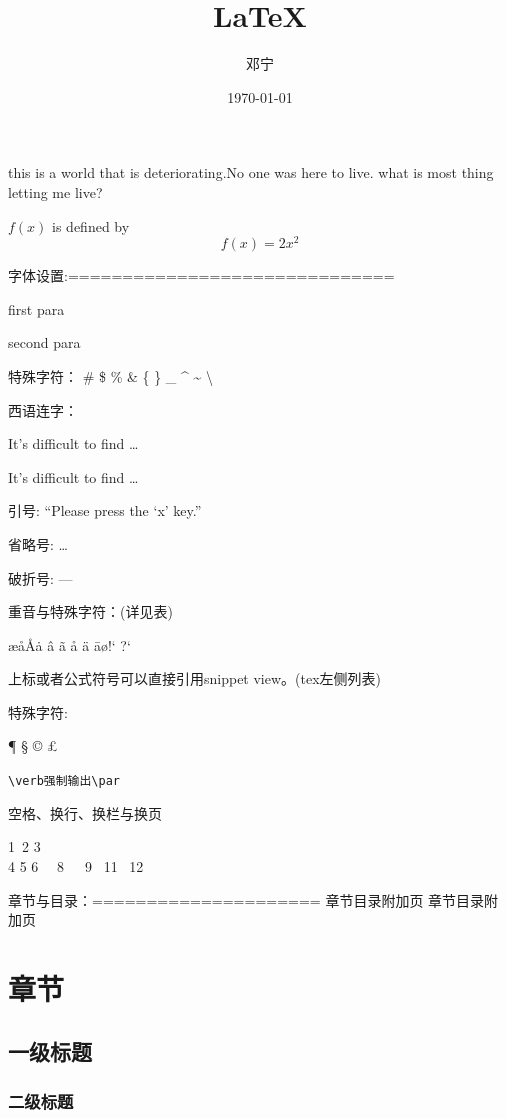 \documentclass[10pt,a4paper,twocolumn]{book}
\title{\LaTeX}
\author{邓宁}
\date{\today}
\begin{document}
\maketitle  %
this is a world that is deteriorating.No one was here to live.
what is most thing letting me live? %

$f(x)$ is defined by $$f(x)=2x^2$$  %

字体设置:==============================

first para
\par second para %

特殊字符：
\# \$ \% \& \{ \} \_ \^{} \~{} \textbackslash

西语连字：
\par It's difficult to find \ldots 
\par It's dif{}f{}icult to f{}ind \ldots

引号: ``Please press the `x' key.''

省略号: \dots

破折号: ---

重音与特殊字符：(详见表)

\ae \aa \AA \.a \^a \~a \r a \"a \=a\o !` ?`

上标或者公式符号可以直接引用snippet view。(tex左侧列表)

特殊字符:

\P{} \S{} \dag{} \ddag{}
\copyright{} \pounds{}
\textasteriskcentered \textperiodcentered \textbullet
\textregistered{} \texttrademark

\verb|\verb强制输出\par|

空格、换行、换栏与换页

1~2 3\\4 5 6 %
~~8~~~9 %
~11 ~12  %

章节与目录：=====================
\clearpage 章节目录附加页
\tableofcontents %
章节目录附加页
\chapter{章节}
\section[short title]{一级标题} %
\subsection{二级标题}
\end{document}
